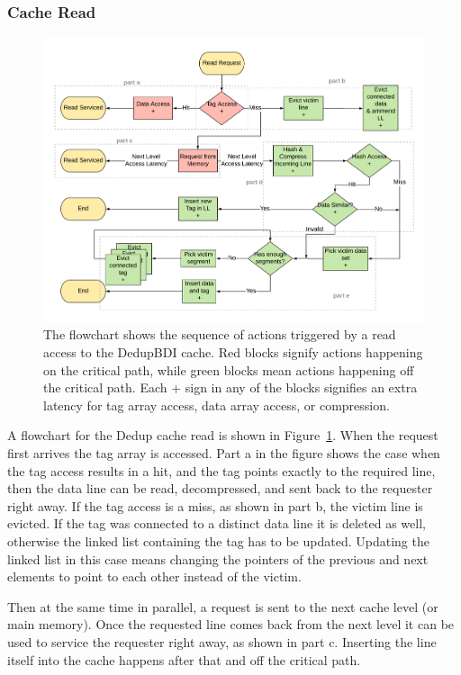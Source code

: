 \subsubsection{Cache Read}
\begin{figure}
    \includegraphics[width=\textwidth]{DedupBDI_Read.pdf}
    \caption[DedupBDI Read]{The flowchart shows the sequence of actions triggered by a read access to the DedupBDI cache. Red blocks signify actions happening on the critical path, while green blocks mean actions happening off the critical path. Each + sign in any of the blocks signifies an extra latency for tag array access, data array access, or compression.}
    \label{fig:DedupBDI_Read}
\end{figure}
A flowchart for the Dedup cache read is shown in Figure~\ref{fig:DedupBDI_Read}. When the request first arrives the tag array is accessed. Part a in the figure shows the case when the tag access results in a hit, and the tag points exactly to the required line, then the data line can be read, decompressed, and sent back to the requester right away. If the tag access is a miss, as shown in part b, the victim line is evicted. If the tag was connected to a distinct data line it is deleted as well, otherwise the linked list containing the tag has to be updated. Updating the linked list in this case means changing the pointers of the previous and next elements to point to each other instead of the victim.\par
Then at the same time in parallel, a request is sent to the next cache level (or main memory). Once the requested line comes back from the next level it can be used to service the requester right away, as shown in part c. Inserting the line itself into the cache happens after that and off the critical path.\par
